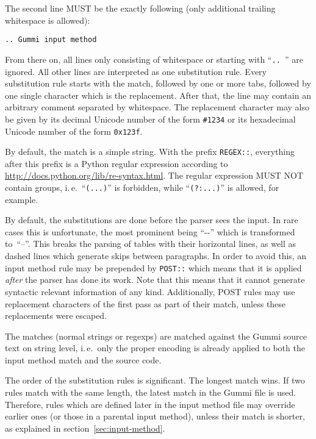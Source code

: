 \documentclass[12pt,openany]{book}
\begin{document}
The second line MUST be the exactly following (only additional trailing
whitespace is allowed):

\begin{lstlisting}
.. Gummi input method
\end{lstlisting}

From there on, all lines only consisting of whitespace or starting with
``\verb*|.. |'' are ignored.  All other lines are interpreted as one
substitution rule.  Every substitution rule starts with the match, followed by
one or more tabs, followed by one single character which is the replacement.
After that, the line may contain an arbitrary comment separated by whitespace.
The replacement character may also be given by its decimal Unicode number of
the form \verb|#1234| or its hexadecimal Unicode number of the form
\verb|0x123f|.

By default, the match is a simple string.  With the prefix \verb|REGEX::|,
everything after this prefix is a Python regular expression according to
\url{http://docs.python.org/lib/re-syntax.html}.  The regular expression MUST
NOT contain groups, i.\,e.\ ``\verb|(...)|'' is forbidden, while
``\verb|(?:...)|'' is allowed, for example.

By default, the substitutions are done before the parser sees the input.  In
rare cases this is unfortunate, the most prominent being ``\mbox{-{}-}'' which
is transformed to~``--''.  This breaks the parsing of tables with their
horizontal lines, as well as dashed lines which generate skips between
paragraphs.  In order to avoid this, an input method rule may be prepended by
\verb|POST::| which means that it is applied \emph{after} the parser has done
its work.  Note that this means that it cannot generate syntactic relevant
information of any kind.  Additionally, POST rules may use replacement
characters of the first pass as part of their match, unless these replacements
were escaped.

The matches (normal strings or regexps) are matched against the Gummi source
text on string level, i.\,e.\ only the proper encoding is already applied to
both the input method match and the source code.

The order of the substitution rules is significant.  The longest match wins.
If two rules match with the same length, the latest match in the Gummi file is
used.  Therefore, rules which are defined later in the input method file may
override earlier ones (or those in a parental input method), unless their match
is shorter, as explained in section~\ref{sec:input-method}.
\end{document}
